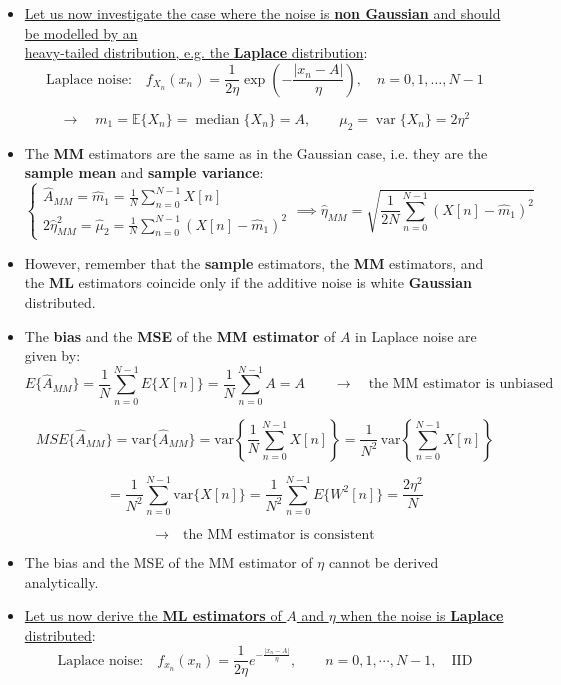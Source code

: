 \begin{itemize}
    \item \underline{Let us now investigate the case where the noise is \textbf{non Gaussian} and should be modelled by an }\\
    \noindent \underline{heavy-tailed distribution, e.g. the \textbf{Laplace} distribution}:
    \[
\text{Laplace noise:} \quad
f_{X_n}(x_n) = \frac{1}{2\eta} \exp\left(-\frac{|x_n - A|}{\eta}\right),
\quad n = 0, 1, \ldots, N-1
\]

\[
\rightarrow \quad
m_1 = \mathbb{E}\{ X_n \} = \operatorname{median}\{ X_n \} = A, \qquad
\mu_2 = \operatorname{var}\{ X_n \} = 2\eta^2
\]
    \item The \textbf{MM} estimators are the same as in the Gaussian case, i.e. they are the \textbf{sample mean} and \textbf{sample variance}:
\[
\left\{
\begin{array}{l}
\hat{A}_{MM} = \hat{m}_1 = \frac{1}{N} \sum\limits_{n=0}^{N-1} X[n] \\[3ex]
2\hat{\eta}^2_{MM} = \hat{\mu}_2 = \frac{1}{N} \sum\limits_{n=0}^{N-1} \left( X[n] - \hat{m}_1 \right)^2
\end{array}
\right.
\implies
\hat{\eta}_{MM} = \sqrt{ \frac{1}{2N} \sum\limits_{n=0}^{N-1} \left( X[n] - \hat{m}_1 \right)^2 }
\]

    \item However, remember that the \textbf{sample} estimators, the \textbf{MM} estimators, and the \textbf{ML} estimators coincide only if the additive noise is white \textbf{Gaussian} distributed.
    \item The \textbf{bias} and the \textbf{MSE} of the \textbf{MM estimator} of \(A\) in Laplace noise are given by:
\[
E\{\hat{A}_{MM}\} = \frac{1}{N} \sum_{n=0}^{N-1} E\{X[n]\}
= \frac{1}{N} \sum_{n=0}^{N-1} A = A
\qquad \rightarrow \quad \text{the MM estimator is unbiased}
\]

\[
MSE\{\hat{A}_{MM}\} = \mathrm{var}\{\hat{A}_{MM}\}
= \mathrm{var}\left\{ \frac{1}{N} \sum_{n=0}^{N-1} X[n] \right\}
= \frac{1}{N^2} \, \mathrm{var}\left\{ \sum_{n=0}^{N-1} X[n] \right\}
\]

\[
= \frac{1}{N^2} \sum_{n=0}^{N-1} \mathrm{var}\{X[n]\}
= \frac{1}{N^2} \sum_{n=0}^{N-1} E\{W^2[n]\}
= \frac{2\eta^2}{N}
\]

\[
\rightarrow \quad \text{the MM estimator is consistent}
\]

    \item The bias and the MSE of the MM estimator of \(\eta\) cannot be derived analytically.
    \item \underline{Let us now derive the \textbf{ML estimators} of \(A\) and \(\eta\) when the noise is \textbf{Laplace} distributed}:
\[
\text{Laplace noise:} \quad
f_{x_n}(x_n) = \frac{1}{2\eta} e^{-\frac{|x_n - A|}{\eta}},
\qquad n = 0, 1, \cdots, N-1, \quad \text{IID}
\]


\end{itemize}
